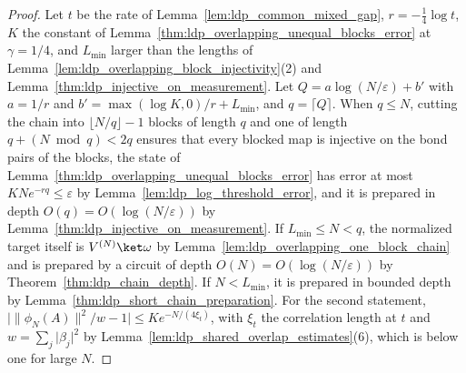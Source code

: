 \begin{proof}
    \leanok
    Let $t$ be the rate of Lemma~\ref{lem:ldp_common_mixed_gap},
    $r=-\tfrac14\log t$, $K$ the constant of
    Lemma~\ref{thm:ldp_overlapping_unequal_blocks_error} at $\gamma=1/4$, and
    $L_{\min}$ larger than the lengths of
    Lemma~\ref{lem:ldp_overlapping_block_injectivity}(2) and
    Lemma~\ref{thm:ldp_injective_on_measurement}. Let
    $Q=a\log(N/\varepsilon)+b'$ with $a=1/r$ and
    $b'=\max(\log K,0)/r+L_{\min}$, and $q=\lceil Q\rceil$. When $q\leq N$, cutting the
    chain into $\lfloor N/q\rfloor-1$ blocks of length $q$ and one of length
    $q+(N\bmod q)<2q$ ensures that every blocked map is injective on the bond pairs of the
    blocks, the state of Lemma~\ref{thm:ldp_overlapping_unequal_blocks_error}
    has error at most $KNe^{-rq}\leq\varepsilon$ by
    Lemma~\ref{lem:ldp_log_threshold_error}, and it is prepared in depth
    $O(q)=O(\log(N/\varepsilon))$ by
    Lemma~\ref{thm:ldp_injective_on_measurement}. If $L_{\min}\leq N<q$, the
    normalized target itself is $V^{(N)}\ket\omega$ by
    Lemma~\ref{lem:ldp_overlapping_one_block_chain} and is prepared by a circuit
    of depth $O(N)=O(\log(N/\varepsilon))$ by Theorem~\ref{thm:ldp_chain_depth}.
    If $N<L_{\min}$, it is prepared in bounded depth by
    Lemma~\ref{thm:ldp_short_chain_preparation}. For the second statement,
    $\lvert\lVert\phi_N(A)\rVert^2/w-1\rvert\leq Ke^{-N/(4\xi_t)}$, with
    $\xi_t$ the correlation length at $t$ and
    $w=\sum_j\lvert\beta_j\rvert^2$ by
    Lemma~\ref{lem:ldp_shared_overlap_estimates}(6), which is below one for
    large $N$.
\end{proof}

